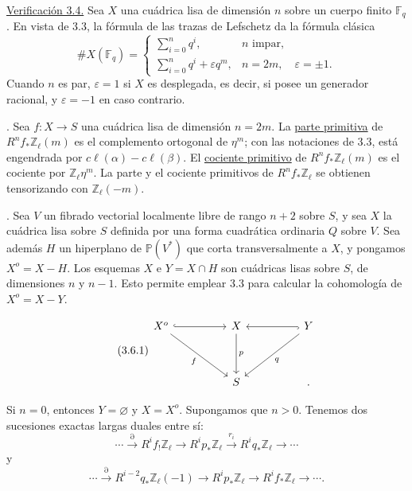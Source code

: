 \medskip
\noindent\underline{Verificación 3.4.}\quad
Sea $X$ una cuádrica lisa de dimensión $n$ sobre un cuerpo finito
$\mathbb F_q$. En vista de 3.3, la fórmula de las trazas de Lefschetz da
la fórmula clásica
\begin{equation*}
\#X(\mathbb F_q)=
\begin{cases}
\displaystyle\sum_{i=0}^{n}q^i,
  & n\text{ impar},\\[2ex]
\displaystyle\sum_{i=0}^{n}q^i+\varepsilon q^m,
  & n=2m,\quad \varepsilon=\pm1.
\end{cases}
\end{equation*}
Cuando $n$ es par, $\varepsilon=1$ si $X$ es desplegada, es decir, si posee
un generador racional, y $\varepsilon=-1$ en caso contrario.

\medskip
{}. Sea $f:X\longrightarrow S$ una cuádrica lisa de dimensión
$n=2m$. La \underline{parte primitiva} de
$R^nf_*\mathbb Z_\ell(m)$ es el complemento ortogonal de $\eta^m$; con
las notaciones de 3.3, está engendrada por
$c\ell(\alpha)-c\ell(\beta)$. El \underline{cociente primitivo} de
$R^nf_*\mathbb Z_\ell(m)$ es el cociente por
$\mathbb Z_\ell\eta^m$. La parte y el cociente primitivos de
$R^nf_*\mathbb Z_\ell$ se obtienen tensorizando con
$\mathbb Z_\ell(-m)$.

\medskip
{}. Sea $V$ un fibrado vectorial localmente libre de rango
$n+2$ sobre $S$, y sea $X$ la cuádrica lisa sobre $S$ definida por una
forma cuadrática ordinaria $Q$ sobre $V$. Sea además $H$ un hiperplano de
$\mathbb P(V^*)$ que corta transversalmente a $X$, y pongamos
$X^o=X-H$. Los esquemas $X$ e $Y=X\cap H$ son cuádricas lisas sobre $S$,
de dimensiones $n$ y $n-1$. Esto permite emplear 3.3 para calcular la
cohomología de $X^o=X-Y$.

\pageoriginale

\begin{equation}\tag{3.6.1}
\begin{tikzcd}[column sep=huge,row sep=huge]
X^o \arrow[r,hook] \arrow[rd,"f"']
  & X \arrow[d,"p"]
  & Y \arrow[l,hook] \arrow[ld,"q"]\\
{} & S & \mathord{.}
\end{tikzcd}
\end{equation}

Si $n=0$, entonces $Y=\varnothing$ y $X=X^o$. Supongamos que $n>0$.
Tenemos dos sucesiones exactas largas duales entre sí:
\begin{equation}\tag{3.6.2}
\cdots\xrightarrow{\partial}R^if_!\mathbb Z_\ell
\longrightarrow R^ip_*\mathbb Z_\ell
\xrightarrow{r_i}R^iq_*\mathbb Z_\ell\longrightarrow\cdots
\end{equation}
y
\begin{equation}\tag{3.6.3}
\cdots\xrightarrow{\partial}R^{i-2}q_*\mathbb Z_\ell(-1)
\longrightarrow R^ip_*\mathbb Z_\ell
\longrightarrow R^if_*\mathbb Z_\ell\longrightarrow\cdots.
\end{equation}

